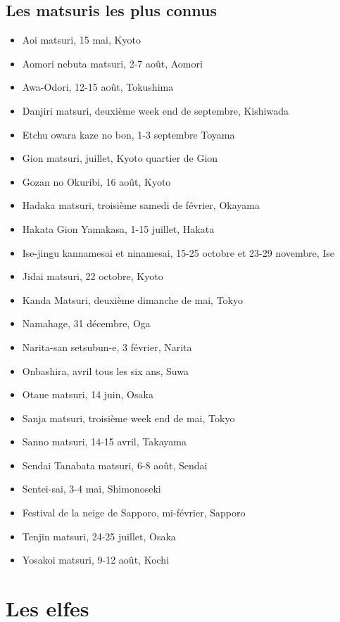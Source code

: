 \section{Les matsuris les plus connus}

\begin{itemize}
	\item Aoi matsuri, 15 mai, Kyoto
	\item Aomori nebuta matsuri, 2-7 août, Aomori
	\item Awa-Odori, 12-15 août, Tokushima
	\item Danjiri matsuri, deuxième week end de septembre, Kishiwada
	\item Etchu owara kaze no bon, 1-3 septembre Toyama
	\item Gion matsuri, juillet, Kyoto quartier de Gion
	\item Gozan no Okuribi, 16 août, Kyoto
	\item Hadaka matsuri, troisième samedi de février, Okayama
	\item Hakata Gion Yamakasa, 1-15 juillet, Hakata
	\item Ise-jingu kannamesai et ninamesai, 15-25 octobre et 23-29 novembre, Ise
	\item Jidai matsuri, 22 octobre, Kyoto
	\item Kanda Matsuri, deuxième dimanche de mai, Tokyo
	\item Namahage, 31 décembre, Oga
	\item Narita-san setsubun-e, 3 février, Narita
	\item Onbashira, avril tous les six ans, Suwa
	\item Otaue matsuri, 14 juin, Osaka
	\item Sanja matsuri, troisième week end de mai, Tokyo
	\item Sanno matsuri, 14-15 avril, Takayama
	\item Sendai Tanabata matsuri, 6-8 août, Sendai
	\item Sentei-sai, 3-4 mai, Shimonoseki
	\item Festival de la neige de Sapporo, mi-février, Sapporo
	\item Tenjin matsuri, 24-25 juillet, Osaka
	\item Yosakoi matsuri, 9-12 août, Kochi
\end{itemize}

\chapter{Les elfes}
